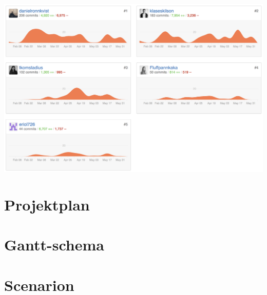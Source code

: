 \documentclass[a4paper,12pt,oneside,final]{extbook}
\newenvironment{Figure}
  {\par\medskip\noindent\minipage{\linewidth}}
  {\endminipage\par\medskip}
\begin{document}
\begin{Figure}
  \centering
    \includegraphics[width=1\textwidth]{appendix/gitstats.png}
\end{Figure}

\chapter{Projektplan}

\chapter{Gantt-schema}

\chapter{Scenarion}

\end{document}

